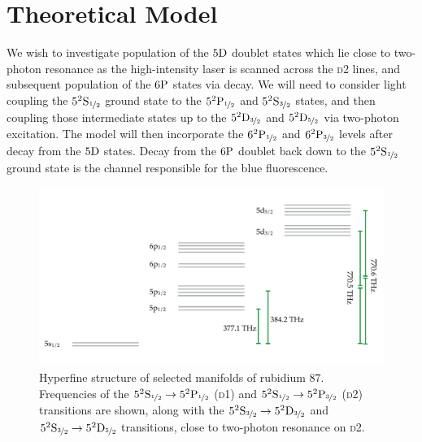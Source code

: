 \section{Theoretical Model}
  \label{sec:twophoton_theory}

    We wish to investigate population of the $5\rm{D}$ doublet states which lie
    close to two-photon resonance as the high-intensity laser is scanned across
    the \textsc{d2} lines, and subsequent population of the $6\rm{P}$ states via
    decay. We will need to consider light coupling the
    $5^2\rm{S}_{\nicefrac{1}{2}}$ ground state to the
    $5^2\rm{P}_{\nicefrac{1}{2}}$ and $5^2\rm{S}_{\nicefrac{3}{2}}$ states, and
    then coupling those intermediate states up to the
    $5^2\rm{D}_{\nicefrac{3}{2}}$ and $5^2\rm{D}_{\nicefrac{5}{2}}$ via 
    two-photon excitation. The model will then incorporate the
    $6^2\rm{P}_{\nicefrac{1}{2}}$ and $6^2\rm{P}_{\nicefrac{3}{2}}$ levels after
    decay from the $5\rm{D}$ states. Decay from the $6\rm{P}$ doublet back down
    to the $5^2\rm{S}_{\nicefrac{1}{2}}$ ground state is the channel responsible
    for the blue fluorescence.

    \begin{figure}[]
    \includegraphics[width=\linewidth]
        {figs/05_twophoton/twophoton_level_scheme.pdf}
    \caption{
    Hyperfine structure of selected manifolds of rubidium 87. Frequencies of the
    $5^2\rm{S}_{\nicefrac{1}{2}} \rightarrow 5^2\rm{P}_{\nicefrac{1}{2}}$
    (\textsc{d1}) and $5^2\rm{S}_{\nicefrac{1}{2}} \rightarrow
    5^2\rm{P}_{\nicefrac{3}{2}}$ (\textsc{d2}) transitions are shown, along with
    the $5^2\rm{S}_{\nicefrac{3}{2}} \rightarrow 5^2\rm{D}_{\nicefrac{3}{2}}$
    and  $5^2\rm{S}_{\nicefrac{3}{2}} \rightarrow 5^2\rm{D}_{\nicefrac{5}{2}}$
    transitions, close to two-photon resonance on \textsc{d2}.
    } 
    \label{fig:two_photon_level_scheme} 
    \end{figure}

